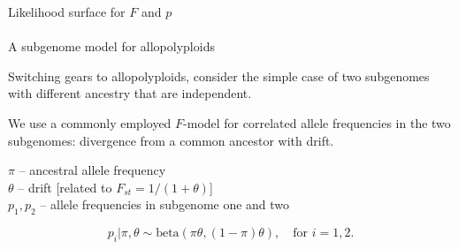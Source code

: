 \documentclass[presentation,sansserif]{beamer}
\begin{document}
{  
\begin{frame}[c,plain]{Likelihood surface for $F$ and $p$}
\pause
	\framesubtitle{\hspace{15pt}}
	\begin{center}
	\end{center}
\end{frame}
}

\begin{frame}[t]{A subgenome model for allopolyploids}

Switching gears to allopolyploids, \pause consider the simple case of two subgenomes with different ancestry that are independent.
\vspace{0.3in}
\pause

We use a commonly employed $F$-model for correlated allele frequencies in the two subgenomes: divergence from a common ancestor with drift.
\vspace{0.3in}
\pause


$\pi$ -- ancestral allele frequency\\
$\theta$ -- drift [related to $F_{st} = 1/(1+\theta)$] \\
$p_1,p_2$ -- allele frequencies in subgenome one and two\\
\vspace{0.3in}
\pause

\begin{equation}
p_i|\pi,\theta \sim \text{beta}(\pi\theta,(1-\pi)\theta), \quad \text{for } i=1,2.
\end{equation}

\end{frame}
\end{document}
